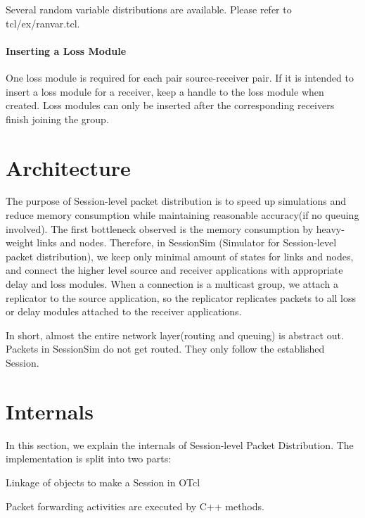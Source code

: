 Several random variable distributions are available.
Please refer to tcl/ex/ranvar.tcl.

\paragraph{Inserting a Loss Module}

One loss module is required for each pair source-receiver pair. If it is
intended to insert a loss module for a receiver, keep a handle to the 
loss module when created.  Loss modules can only be inserted after the
corresponding receivers finish joining the group.


\section{Architecture}
\label{sec:session-arch}
The purpose of Session-level packet distribution is to
speed up simulations and reduce memory consumption while 
maintaining reasonable accuracy(if no queuing involved).  The first
bottleneck observed is the memory consumption by heavy-weight
links and nodes.  Therefore, in SessionSim (Simulator for Session-level
packet distribution), we keep only minimal amount of 
states for links and nodes, and connect the higher level source and 
receiver applications with appropriate delay and loss modules.  When
a connection is a multicast group, we attach a replicator 
to the source application, so the replicator replicates packets
to all loss or delay modules attached to the receiver applications.

In short, almost the entire network layer(routing and queuing)
is abstract out.  Packets in SessionSim do not get routed.  
They only follow the established Session.

\section{Internals}
In this section, we explain the internals of Session-level Packet 
Distribution.  The implementation is split into two parts:
\begin{list}{}{}
\item  Linkage of objects to make a Session in OTcl 
\item  Packet forwarding activities are executed by C++ methods.  
\end{list}

